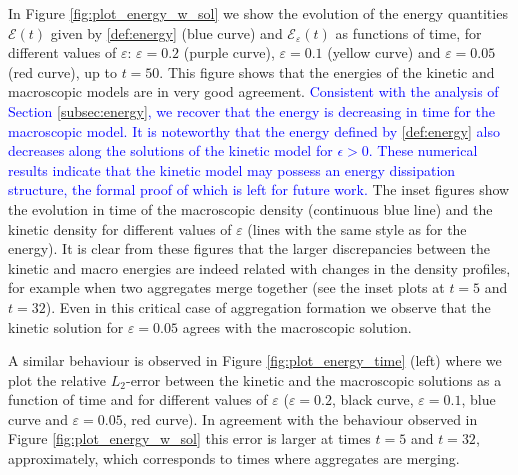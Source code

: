 \documentclass{article}
\newcommand {\e}  {\varepsilon}
\begin{document}
{In Figure \ref{fig:plot_energy_w_sol} we show the evolution of the energy quantities $\mathcal{E}(t)$ given by \eqref{def:energy} (blue curve) and $\mathcal{E}_\varepsilon(t)$ as functions of time, for different values of $\e$: $\varepsilon=0.2$ (purple curve), $\e = 0.1$ (yellow curve) and $\e = 0.05$ (red curve), up to $t=50$. This figure shows that the energies of the kinetic and macroscopic models are in very good agreement}. \textcolor{blue}{Consistent with the analysis of Section \ref{subsec:energy}, we recover that the energy is decreasing in time for the macroscopic model. It is noteworthy that the energy defined by \eqref{def:energy} also decreases along the solutions of the kinetic model for $\epsilon>0$. These numerical results indicate that the kinetic model may possess an energy dissipation structure, the formal proof of which is left for future work.} The inset figures show the evolution in time of the macroscopic density (continuous blue line) and the kinetic density for different values of $\e$ (lines with the same style as for the energy). It is clear from these figures that the larger discrepancies between the kinetic and macro energies are indeed related with changes in the density profiles, for example when two aggregates merge together {(see the inset plots at $t=5$ and $t=32$)}. {Even in this critical case of aggregation formation we observe that the kinetic solution for $\e=0.05$ agrees with the macroscopic solution.}

A similar behaviour is observed in Figure \ref{fig:plot_energy_time} (left) where we plot the {relative} $L_2$-error between the kinetic and the macroscopic solutions {as a function of time} and for different values of $\e$ {($\e = 0.2$, black curve, $\e = 0.1$, blue curve and $\e = 0.05$, red curve)}. In agreement with the behaviour observed in Figure \ref{fig:plot_energy_w_sol} this error is {larger} at times $t=5$ and $t=32$, approximately, which corresponds {to times where aggregates are merging}.
\end{document}
